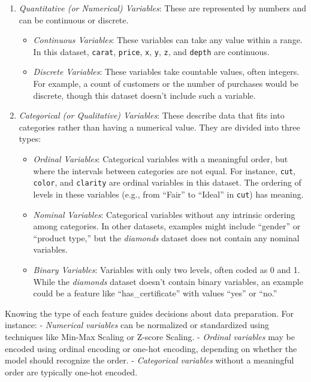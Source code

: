\documentclass[
  11pt,
]{book}
\newcommand{\passthrough}[1]{#1}
\providecommand{\tightlist}{%
  \setlength{\itemsep}{0pt}\setlength{\parskip}{0pt}}
\theoremstyle{definition}
\theoremstyle{definition}
\theoremstyle{definition}
\theoremstyle{definition}
\theoremstyle{remark}
\begin{document}
\begin{enumerate}
\def\labelenumi{\arabic{enumi}.}
\tightlist
\item
  \emph{Quantitative (or Numerical) Variables}: These are represented by numbers and can be continuous or discrete.

  \begin{itemize}
  \tightlist
  \item
    \emph{Continuous Variables}: These variables can take any value within a range. In this dataset, \passthrough{\lstinline!carat!}, \passthrough{\lstinline!price!}, \passthrough{\lstinline!x!}, \passthrough{\lstinline!y!}, \passthrough{\lstinline!z!}, and \passthrough{\lstinline!depth!} are continuous.
  \item
    \emph{Discrete Variables}: These variables take countable values, often integers. For example, a count of customers or the number of purchases would be discrete, though this dataset doesn't include such a variable.
  \end{itemize}
\item
  \emph{Categorical (or Qualitative) Variables}: These describe data that fits into categories rather than having a numerical value. They are divided into three types:

  \begin{itemize}
  \tightlist
  \item
    \emph{Ordinal Variables}: Categorical variables with a meaningful order, but where the intervals between categories are not equal. For instance, \passthrough{\lstinline!cut!}, \passthrough{\lstinline!color!}, and \passthrough{\lstinline!clarity!} are ordinal variables in this dataset. The ordering of levels in these variables (e.g., from ``Fair'' to ``Ideal'' in \passthrough{\lstinline!cut!}) has meaning.
  \item
    \emph{Nominal Variables}: Categorical variables without any intrinsic ordering among categories. In other datasets, examples might include ``gender'' or ``product type,'' but the \emph{diamonds} dataset does not contain any nominal variables.
  \item
    \emph{Binary Variables}: Variables with only two levels, often coded as 0 and 1. While the \emph{diamonds} dataset doesn't contain binary variables, an example could be a feature like ``has\_certificate'' with values ``yes'' or ``no.''
  \end{itemize}
\end{enumerate}

Knowing the type of each feature guides decisions about data preparation. For instance:
- \emph{Numerical variables} can be normalized or standardized using techniques like Min-Max Scaling or Z-score Scaling.
- \emph{Ordinal variables} may be encoded using ordinal encoding or one-hot encoding, depending on whether the model should recognize the order.
- \emph{Categorical variables} without a meaningful order are typically one-hot encoded.
\end{document}

